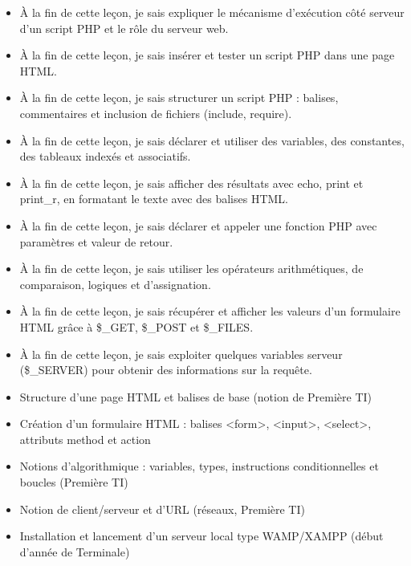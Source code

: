 \documentclass[11pt]{article}
\begin{document}
\begin{objectifs}
\begin{itemize}
\item À la fin de cette leçon, je sais expliquer le mécanisme d'exécution côté serveur d'un script PHP et le rôle du serveur web.
\item À la fin de cette leçon, je sais insérer et tester un script PHP dans une page HTML.
\item À la fin de cette leçon, je sais structurer un script PHP : balises, commentaires et inclusion de fichiers (include, require).
\item À la fin de cette leçon, je sais déclarer et utiliser des variables, des constantes, des tableaux indexés et associatifs.
\item À la fin de cette leçon, je sais afficher des résultats avec echo, print et print\_r, en formatant le texte avec des balises HTML.
\item À la fin de cette leçon, je sais déclarer et appeler une fonction PHP avec paramètres et valeur de retour.
\item À la fin de cette leçon, je sais utiliser les opérateurs arithmétiques, de comparaison, logiques et d'assignation.
\item À la fin de cette leçon, je sais récupérer et afficher les valeurs d'un formulaire HTML grâce à \$\_GET, \$\_POST et \$\_FILES.
\item À la fin de cette leçon, je sais exploiter quelques variables serveur (\$\_SERVER) pour obtenir des informations sur la requête.
\end{itemize}
\end{objectifs}

\begin{prerequis}
\begin{itemize}
\item Structure d'une page HTML et balises de base (notion de Première TI)
\item Création d'un formulaire HTML : balises <form>, <input>, <select>, attributs method et action
\item Notions d'algorithmique : variables, types, instructions conditionnelles et boucles (Première TI)
\item Notion de client/serveur et d'URL (réseaux, Première TI)
\item Installation et lancement d'un serveur local type WAMP/XAMPP (début d'année de Terminale)
\end{itemize}
\end{prerequis}
\end{document}
